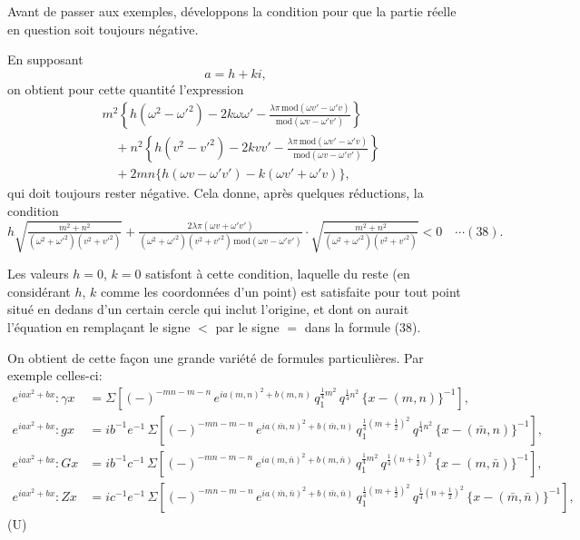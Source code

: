 \documentclass[12pt,a4paper]{article}
\begin{document}
Avant de passer aux exemples, d\'eveloppons la condition pour que la partie r\'eelle en question soit toujours n\'egative.

En supposant
\[
a = h + ki,
\]
on obtient pour cette quantit\'e l'expression
\begin{align*}
&m^2\left\{h(\omega^2 - \omega'^2) - 2k\omega\omega' - \tfrac{\lambda\pi\,\mathrm{mod}(\omega v' - \omega' v)}{\mathrm{mod}(\omega v - \omega' v')}\right\}\\
&\quad + n^2\left\{h(v^2 - v'^2) - 2kvv' - \tfrac{\lambda\pi\,\mathrm{mod}(\omega v' - \omega' v)}{\mathrm{mod}(\omega v - \omega' v')}\right\}\\
&\quad + 2mn\{h(\omega v - \omega' v') - k(\omega v' + \omega' v)\},
\end{align*}
qui doit toujours rester n\'egative. Cela donne, apr\`es quelques r\'eductions, la condition
\[
h \sqrt{\tfrac{m^2 + n^2}{(\omega^2 + \omega'^2)(v^2 + v'^2)}} + \tfrac{2\lambda\pi(\omega v + \omega' v')}{(\omega^2 + \omega'^2)(v^2 + v'^2)\,\mathrm{mod}(\omega v - \omega' v')} \cdot \sqrt{\tfrac{m^2 + n^2}{(\omega^2 + \omega'^2)(v^2 + v'^2)}} < 0 \quad\cdots(38).
\]

\newpage
\setcounter{page}{177}

Les valeurs $h = 0$, $k = 0$ satisfont \`a cette condition, laquelle du reste (en consid\'erant $h$, $k$ comme les coordonn\'ees d'un point) est satisfaite pour tout point situ\'e en dedans d'un certain cercle qui inclut l'origine, et dont on aurait l'\'equation en rempla\c cant le signe $<$ par le signe $=$ dans la formule (38).

On obtient de cette fa\c con une grande vari\'et\'e de formules particuli\`eres. Par exemple celles-ci:
\begin{align*}
e^{iax^2 + bx} : \gamma x &= \Sigma[(-)^{-mn - m - n}\, e^{ia(m,n)^2 + b(m,n)}\, q_1^{\tfrac14 m^2}\, q^{\tfrac14 n^2}\, \{x - (m,n)\}^{-1}],\\
e^{iax^2 + bx} : gx &= ib^{-1}e^{-1}\, \Sigma[(-)^{-mn - m - n}\, e^{ia(\bar m,n)^2 + b(\bar m,n)}\, q_1^{\tfrac14(m+\frac12)^2}\, q^{\tfrac14 n^2}\, \{x - (\bar m,n)\}^{-1}],\\
e^{iax^2 + bx} : Gx &= ib^{-1}c^{-1}\, \Sigma[(-)^{-mn - m - n}\, e^{ia(m,\bar n)^2 + b(m,\bar n)}\, q_1^{\tfrac14 m^2}\, q^{\tfrac14(n+\frac12)^2}\, \{x - (m,\bar n)\}^{-1}],\\
e^{iax^2 + bx} : Zx &= ic^{-1}e^{-1}\, \Sigma[(-)^{-mn - m - n}\, e^{ia(\bar m,\bar n)^2 + b(\bar m,\bar n)}\, q_1^{\tfrac14(m+\frac12)^2}\, q^{\tfrac14(n+\frac12)^2}\, \{x - (\bar m,\bar n)\}^{-1}],
\end{align*}
\hfill (U)
\end{document}
